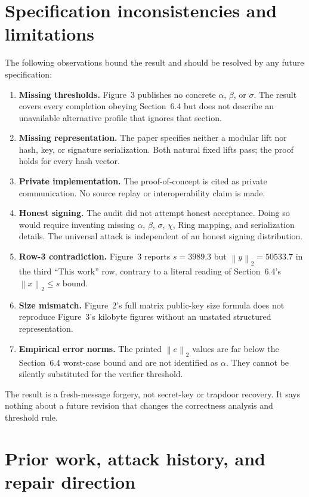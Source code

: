 \documentclass[10pt,a4paper]{article}
\newcommand{\norm}[1]{\left\lVert #1\right\rVert_2}
\begin{document}
\section{Specification inconsistencies and limitations}

The following observations bound the result and should be resolved by any
future specification:
\begin{enumerate}
  \item \textbf{Missing thresholds.} Figure~3 publishes no concrete
        $\alpha$, $\beta$, or $\sigma$. The result covers every completion
        obeying Section~6.4 but does not describe an unavailable alternative
        profile that ignores that section.
  \item \textbf{Missing representation.} The paper specifies neither a
        modular lift nor hash, key, or signature serialization. Both natural
        fixed lifts pass; the proof holds for every hash vector.
  \item \textbf{Private implementation.} The proof-of-concept is cited as
        private communication. No source replay or interoperability claim is
        made.
  \item \textbf{Honest signing.} The audit did not attempt honest acceptance.
        Doing so would require inventing missing $\alpha$, $\beta$, $\sigma$,
        $\chi$, Ring mapping, and serialization details. The universal attack
        is independent of an honest signing distribution.
  \item \textbf{Row-3 contradiction.} Figure~3 reports $s=3989.3$ but
        $\norm{y}=50533.7$ in the third ``This work'' row, contrary to a
        literal reading of Section~6.4's $\norm{x}\leq s$ bound.
  \item \textbf{Size mismatch.} Figure~2's full matrix public-key size formula
        does not reproduce Figure~3's kilobyte figures without an unstated
        structured representation.
  \item \textbf{Empirical error norms.} The printed $\norm{e}$ values are far
        below the Section~6.4 worst-case bound and are not identified as
        $\alpha$. They cannot be silently substituted for the verifier
        threshold.
\end{enumerate}

The result is a fresh-message forgery, not secret-key or trapdoor recovery.
It says nothing about a future revision that changes the correctness analysis
and threshold rule.

\section{Prior work, attack history, and repair direction}
\end{document}
